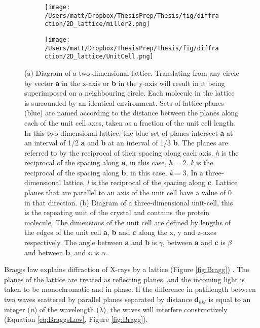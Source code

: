 \begin{figure}[!htbp]
\centering
\begin{subfigure}{.5\textwidth}
  \centering
  \texttt{[image: /Users/matt/Dropbox/ThesisPrep/Thesis/fig/diffraction/2D\_lattice/miller2.png]}
  \caption{}
  \label{fig:2D_lattice}
\end{subfigure}%
\begin{subfigure}{.5\textwidth}
  \centering
  \texttt{[image: /Users/matt/Dropbox/ThesisPrep/Thesis/fig/diffraction/2D\_lattice/UnitCell.png]}
  \caption{}
  \label{fig:UnitCell}
\end{subfigure}
\caption[Diagram of a two-dimensional lattice]{(a) Diagram of a two-dimensional lattice. Translating from any circle by vector \textbf{a} in the x-axis or \textbf{b} in the y-axis will result in it being superimposed on a neighbouring circle. Each molecule in the lattice is surrounded by an identical environment. Sets of lattice planes (blue) are named according to the distance between the planes along each of the unit cell axes, taken as a fraction of the unit cell length. In this two-dimensional lattice, the blue set of planes intersect \textbf{a} at an interval of 1/2 \textbf{a} and \textbf{b} at an interval of 1/3 \textbf{b}. The planes are referred to by the reciprocal of their spacing along each axis. \textit{h} is the reciprocal of the spacing along \textbf{a}, in this case, \textit{h} = 2. \textit{k} is the reciprocal of the spacing along \textbf{b}, in this case, \textit{k} = 3. In a three-dimensional lattice, \textit{l} is the reciprocal of the spacing along \textbf{c}. Lattice planes that are parallel to an axis of the unit cell have a value of 0 in that direction.\newline
(b) Diagram of a three-dimensional unit-cell, this is the repeating unit of the crystal and contains the protein molecule. The dimensions of the unit cell are defined by lengths of the edges of the unit cell \textbf{a}, \textbf{b} and \textbf{c} along the x, y and z-axes respectively. The angle between \textbf{a} and \textbf{b} is $\gamma$, between \textbf{a} and \textbf{c} is $\beta$ and between \textbf{b}, and \textbf{c} is $\alpha$.}
\end{figure}

\par

Braggs law explains diffraction of X-rays by a lattice (Figure \ref{fig:Bragg}) \cite{Bragg1913}. The planes of the lattice are treated as reflecting planes, and the incoming light is taken to be monochromatic and in phase. If the difference in pathlength between two waves scattered by parallel planes separated by distance \textbf{d$_{hkl}$} is equal to an integer (\textit{n}) of the wavelength ($\lambda$), the waves will interfere constructively (Equation \ref{eq:BraggsLaw}, Figure \ref{fig:Bragg}). 

